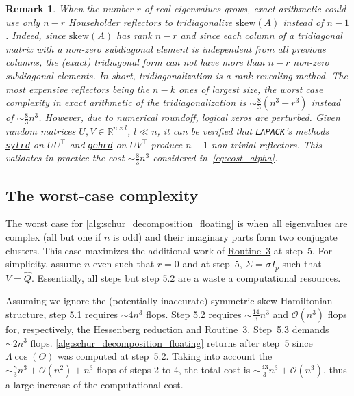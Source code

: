 \documentclass[10pt,twoside,dvipsnames]{siamart1116}
\numberwithin{algorithm}{section}
\newtheorem{remark}[theorem]{Remark}
\numberwithin{equation}{section}
\newcommand{\wordref}[2]{\hyperlink{#1}{#2}}
\begin{document}
	\begin{remark}\label{rem:low_rank}
\emph{When the number $r$ of real eigenvalues grows, exact arithmetic could use only $n-r$ Householder reflectors to tridiagonalize $\mathrm{skew}(A)$ instead of $n-1$. Indeed, since $\mathrm{skew}(A)$ has rank $n-r$ and since each column of a tridiagonal matrix with a non-zero subdiagonal element is independent from all previous columns, the (exact) tridiagonal form can not have more than $n-r$ non-zero subdiagonal elements. In short, tridiagonalization is a rank-revealing method. The most expensive reflectors being the $n-k$ ones of largest size, the worst case complexity in exact arithmetic of the tridiagonalization is  $\sim\frac{8}{3}(n^3-r^3)$ instead of $\sim\frac{8}{3}n^3$. However, due to numerical roundoff, logical zeros are perturbed. Given random matrices $U,V\in \mathbb{R}^{n\times l}$, $l\ll n$, it can be verified that \texttt{LAPACK}'s methods \href{https://www.netlib.org/lapack/explore-html/df/d34/group__hetrd_gac6c89000449da7196e0273911fe492b2.html}{\texttt{sytrd}} on $UU^\top $ and \href{https://www.netlib.org/lapack/explore-html/d2/d28/group__gehrd_ga74cea8f05a014cca243674999f71c238.html}{\texttt{gehrd}} on $UV^\top $ produce $n-1$ non-trivial reflectors. This validates in practice the cost $\sim\frac{8}{3}n^3$ considered in~\eqref{eq:cost_alpha}.}
	\end{remark}
\subsection{The worst-case complexity}\label{subsec:worst_complexity}
	The worst case for \cref{alg:schur_decomposition_floating} is when all eigenvalues are complex (all but one if $n$ is odd) and their imaginary parts form two conjugate  clusters. This case maximizes the additional work of \wordref{oracle3}{Routine~3} at step~5. For simplicity, assume $n$ even such that $r=0$ and at step~5, $\Sigma =\sigma I_p$ such that $V=\widehat{Q}$. Essentially, all steps but step 5.2 are a waste a computational resources.
	
Assuming we ignore the (potentially inaccurate) symmetric skew-Hamiltonian structure, step 5.1 requires $\sim 4n^3$ flops. Step 5.2 requires $\sim \frac{14}{3}n^3$ and $\mathcal{O}(n^3)$ flops for, respectively, the Hessenberg reduction and \wordref{oracle3}{Routine~3}. Step~5.3 demands $\sim 2n^3$ flops. \cref{alg:schur_decomposition_floating} returns after step~5 since $\Lambda\cos(\Theta)$ was computed at step~5.2. Taking into account the $\sim \frac{8}{3}n^3+\mathcal{O}(n^2)+n^3$ flops of steps 2 to 4, the total cost is $\sim \frac{43}{3}n^3+\mathcal{O}(n^3)$, thus a large increase of the computational cost.
	
\end{document}
